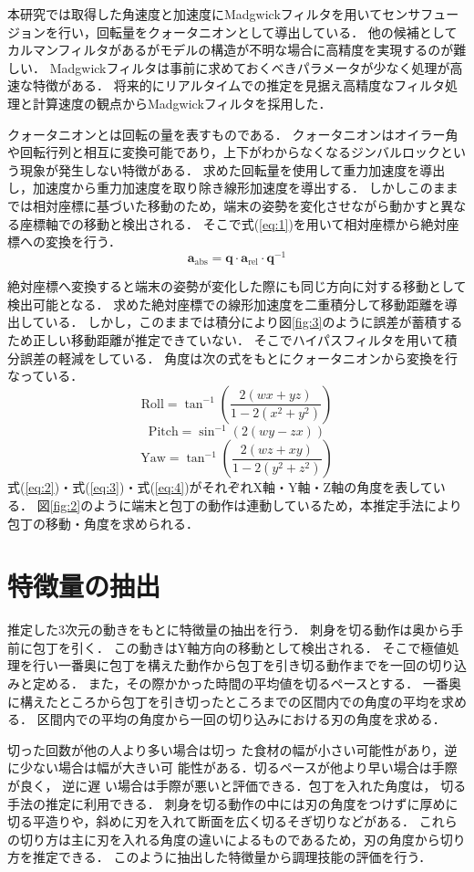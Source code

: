 本研究では取得した角速度と加速度にMadgwickフィルタを用いてセンサフュージョンを行い，回転量をクォータニオンとして導出している．
他の候補としてカルマンフィルタがあるがモデルの構造が不明な場合に高精度を実現するのが難しい．
Madgwickフィルタは事前に求めておくべきパラメータが少なく処理が高速な特徴がある．
将来的にリアルタイムでの推定を見据え高精度なフィルタ処理と計算速度の観点からMadgwickフィルタを採用した．

クォータニオンとは回転の量を表すものである．
クォータニオンはオイラー角や回転行列と相互に変換可能であり，上下がわからなくなるジンバルロックという現象が発生しない特徴がある．
求めた回転量を使用して重力加速度を導出し，加速度から重力加速度を取り除き線形加速度を導出する．
しかしこのままでは相対座標に基づいた移動のため，端末の姿勢を変化させながら動かすと異なる座標軸での移動と検出される．
そこで式(\ref{eq:1})を用いて相対座標から絶対座標への変換を行う．
\begin{equation}
	\mathbf{a}_{\text{abs}} = \mathbf{q} \cdot \mathbf{a}_{\text{rel}} \cdot \mathbf{q}^{-1}
	\label{eq:1}
\end{equation}
	
絶対座標へ変換すると端末の姿勢が変化した際にも同じ方向に対する移動として検出可能となる．
求めた絶対座標での線形加速度を二重積分して移動距離を導出している．
しかし，このままでは積分により図\ref{fig:3}のように誤差が蓄積するため正しい移動距離が推定できていない．
そこでハイパスフィルタを用いて積分誤差の軽減をしている．
角度は次の式をもとにクォータニオンから変換を行なっている．
\begin{equation}
	\text{Roll} = \tan^{-1}\left( \frac{2(w x + y z)}{1 - 2(x^2 + y^2)} \right)
	\label{eq:2}
\end{equation}
\begin{equation}
	\text{Pitch} = \sin^{-1}\left( 2(w y - z x) \right)
	\label{eq:3}
\end{equation}
\begin{equation}
	\text{Yaw} = \tan^{-1}\left( \frac{2(w z + x y)}{1 - 2(y^2 + z^2)} \right)
	\label{eq:4}
\end{equation}
式(\ref{eq:2})・式(\ref{eq:3})・式(\ref{eq:4})がそれぞれX軸・Y軸・Z軸の角度を表している．
図\ref{fig:2}のように端末と包丁の動作は連動しているため，本推定手法により包丁の移動・角度を求められる．

\section{特徴量の抽出}
推定した3次元の動きをもとに特徴量の抽出を行う．
刺身を切る動作は奥から手前に包丁を引く．
この動きはY軸方向の移動として検出される．
そこで極値処理を行い一番奥に包丁を構えた動作から包丁を引き切る動作までを一回の切り込みと定める．
また，その際かかった時間の平均値を切るペースとする．
一番奥に構えたところから包丁を引き切ったところまでの区間内での角度の平均を求める．
区間内での平均の角度から一回の切り込みにおける刃の角度を求める．

切った回数が他の人より多い場合は切っ
た食材の幅が小さい可能性があり，逆に少ない場合は幅が大きい可
能性がある．切るペースが他より早い場合は手際が良く， 逆に遅
い場合は手際が悪いと評価できる．包丁を入れた角度は， 切る手法の推定に利用できる．
刺身を切る動作の中には刃の角度をつけずに厚めに切る平造りや，斜めに刃を入れて断面を広く切るそぎ切りなどがある．
これらの切り方は主に刃を入れる角度の違いによるものであるため，刃の角度から切り方を推定できる．
このように抽出した特徴量から調理技能の評価を行う．